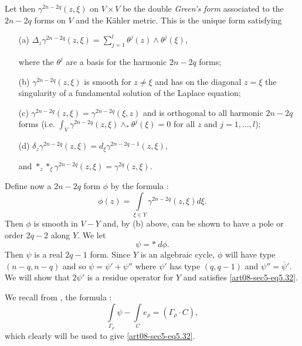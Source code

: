 Let then $\gamma^{2n-2q}(z,\xi)$ on $V\times V$ be the double {\em Green's form} associated to the $2n-2q$ forms on $V$ and the K\"ahler metric. This is the unique form satisfying
\begin{itemize}
\item[(a)]\pageoriginale \hfill $\Delta_{z}\gamma^{2n-2q}(z,\xi)=\sum\limits^{l}_{j=1}\theta^{j}(z)\wedge \theta^{j}(\xi)$,\hfill\,

where the $\theta^{j}$ are a basis for the harmonic $2n-2q$ forms;

\item[(b)] $\gamma^{2n-2q}(z,\xi)$ is smooth for $z\neq\xi$ and has on the diagonal $z=\xi$ the singularity of a fundamental solution of the Laplace equation;

\item[(c)] $\gamma^{2n-2q}(z,\xi)=\gamma^{2n-2q}(\xi,z)$ and is orthogonal to all harmonic $2n-2q$ forms (i.e. $\int_{V}\gamma^{2n-2q}(z,\xi)\wedge_{*}\theta^{j}(\xi)=0$ for all $z$ and $j=1,\ldots,l$); 

\item[(d)] $\delta_{z}\gamma^{2n-2q}(z,\xi)=d_{\xi}\gamma^{2n-2q-1}(z,\xi)$, 

and $*_{z}*_{\xi}\gamma^{2n-2q}(z,\xi)=\gamma^{2q}(z,\xi)$.
\end{itemize}

Define now a $2n-2q$ form $\phi$ by the formula :
\begin{equation*}
\phi(z)=\int\limits_{\xi\in Y}\gamma^{2n-2q}(z,\xi)d\xi.\tag{5.33}\label{art08-sec5-eq5.33}
\end{equation*}
Then $\phi$ is smooth in $V-Y$ and, by (b) above, can be shown to have a pole or order $2q-2$ along $Y$. We let
\begin{equation*}
\psi=* \ d\phi.\tag{5.34}\label{art08-sec5-eq5.34}
\end{equation*}
Then $\psi$ is a real $2q-1$ form. Since $Y$ is an algebraic cycle, $\phi$ will have type $(n-q,n-q)$ and so $\psi=\psi'+\psi''$ where $\psi'$ has type $(q,q-1)$ and $\psi''=\overline{\psi}'$. We will show that $2\psi'$ is a residue operator for $Y$ and satisfies \eqref{art08-sec5-eq5.32}.

We recall from \cite{art08-key17}, the formula :
\begin{equation*}
\int\limits_{\Gamma_{\rho}}\psi-\int\limits_{C}e_{\rho}=(\Gamma_{\rho}\cdot C),\tag{5.35}\label{art08-sec5-eq5.35}
\end{equation*}
which clearly will be used to give \eqref{art08-sec5-eq5.32}.

